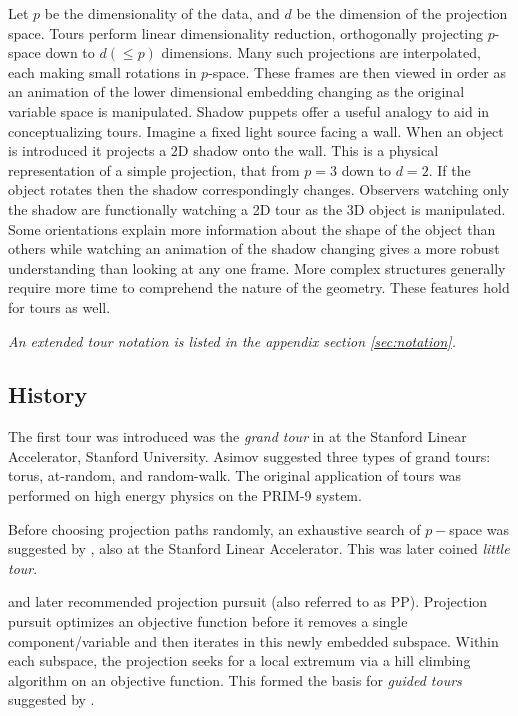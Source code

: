 \documentclass{template/monashthesis}
\begin{document}
Let \(p\) be the dimensionality of the data, and \(d\) be the dimension of the projection space. Tours perform linear dimensionality reduction, orthogonally projecting \(p\)-space down to \(d(\leq p)\) dimensions. Many such projections are interpolated, each making small rotations in \(p\)-space. These frames are then viewed in order as an animation of the lower dimensional embedding changing as the original variable space is manipulated. Shadow puppets offer a useful analogy to aid in conceptualizing tours. Imagine a fixed light source facing a wall. When an object is introduced it projects a 2D shadow onto the wall. This is a physical representation of a simple projection, that from \(p=3\) down to \(d=2\). If the object rotates then the shadow correspondingly changes. Observers watching only the shadow are functionally watching a 2D tour as the 3D object is manipulated. Some orientations explain more information about the shape of the object than others while watching an animation of the shadow changing gives a more robust understanding than looking at any one frame. More complex structures generally require more time to comprehend the nature of the geometry. These features hold for tours as well.

\emph{An extended tour notation is listed in the appendix section \ref{sec:notation}.}

\hypertarget{history}{%
\subsection{History}\label{history}}

The first tour was introduced was the \emph{grand tour} in \textcite{asimov_grand_1985} at the Stanford Linear Accelerator, Stanford University. Asimov suggested three types of grand tours: torus, at-random, and random-walk. The original application of tours was performed on high energy physics on the PRIM-9 system.

Before choosing projection paths randomly, an exhaustive search of \(p-\)space was suggested by \textcite{mcdonald_interactive_1982}, also at the Stanford Linear Accelerator. This was later coined \emph{little tour}.

\textcite{friedman_projection_1974} and later \textcite{huber_projection_1985} recommended projection pursuit (also referred to as PP). Projection pursuit optimizes an objective function before it removes a single component/variable and then iterates in this newly embedded subspace. Within each subspace, the projection seeks for a local extremum via a hill climbing algorithm on an objective function. This formed the basis for \emph{guided tours} suggested by \textcite{hurley_analyzing_1990}.
\end{document}
